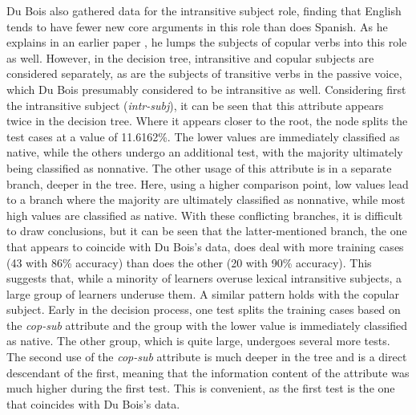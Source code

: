 \documentclass[main.tex]{subfiles}
\begin{document}
Du Bois also gathered data for the intransitive subject role, finding that English tends to have fewer new core arguments in this role than does Spanish. As he explains in an earlier paper \citep{dubois:1987}, he lumps the subjects of copular verbs into this role as well. However, in the decision tree, intransitive and copular subjects are considered separately, as are the subjects of transitive verbs in the passive voice, which Du Bois presumably considered to be intransitive as well. Considering first the intransitive subject (\textit{intr-subj}), it can be seen that this attribute appears twice in the decision tree. Where it appears closer to the root, the node splits the test cases at a value of 11.6162\%. The lower values are immediately classified as native, while the others undergo an additional test, with the majority ultimately being classified as nonnative. The other usage of this attribute is in a separate branch, deeper in the tree. Here, using a higher comparison point, low values lead to a branch where the majority are ultimately classified as nonnative, while most high values are classified as native. With these conflicting branches, it is difficult to draw conclusions, but it can be seen that the latter-mentioned branch, the one that appears to coincide with Du Bois's data, does deal with more training cases (43 with 86\% accuracy) than does the other (20 with 90\% accuracy). This suggests that, while a minority of learners overuse lexical intransitive subjects, a large group of learners underuse them. A similar pattern holds with the copular subject. Early in the decision process, one test splits the training cases based on the \textit{cop-sub} attribute and the group with the lower value is immediately classified as native. The other group, which is quite large, undergoes several more tests. The second use of the \textit{cop-sub} attribute is much deeper in the tree and is a direct descendant of the first, meaning that the information content of the attribute was much higher during the first test. This is convenient, as the first test is the one that coincides with Du Bois's data. 
\end{document}
